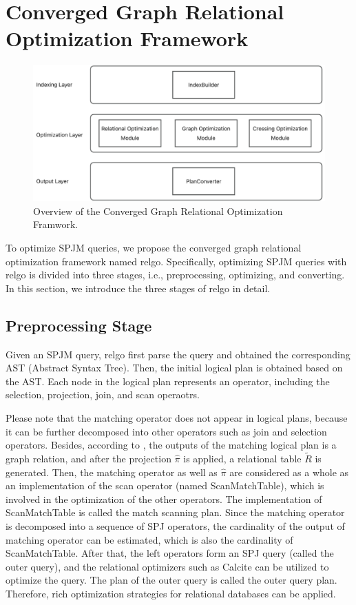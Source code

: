 \section{Converged Graph Relational Optimization Framework}

\begin{figure}
    \centering
    \includegraphics[width=\linewidth]{./figures/framework.png}
    \caption{Overview of the Converged Graph Relational Optimization Framwork.}
    \label{fig:framework-overview}
\end{figure}


To optimize SPJM queries, we propose the converged graph relational optimization framework named relgo.
Specifically, optimizing SPJM queries with relgo is divided into three stages, i.e., preprocessing, optimizing, and converting.
In this section, we introduce the three stages of relgo in detail.

\subsection{Preprocessing Stage}
Given an SPJM query, relgo first parse the query and obtained the corresponding AST (Abstract Syntax Tree).
Then, the initial logical plan is obtained based on the AST.
Each node in the logical plan represents an operator, including the selection, projection, join, and scan operaotrs.

Please note that the matching operator does not appear in logical plans, because it can be further decomposed into other operators such as join and selection operators.
Besides, according to , the outputs of the matching logical plan is a graph relation, and after the projection $\widehat{\pi}$ is applied, a relational table $\tilde{R}$ is generated.
Then, the matching operator as well as $\widehat{\pi}$ are considered as a whole as an implementation of the scan operator (named ScanMatchTable), which is involved in the optimization of the other operators.
The implementation of ScanMatchTable is called the match scanning plan.
Since the matching operator is decomposed into a sequence of SPJ operators, the cardinality of the output of matching operator can be estimated, which is also the cardinality of ScanMatchTable.
After that, the left operators form an SPJ query (called the outer query), and the relational optimizers such as Calcite can be utilized to optimize the query.
The plan of the outer query is called the outer query plan.
Therefore, rich optimization strategies for relational databases can be applied.


